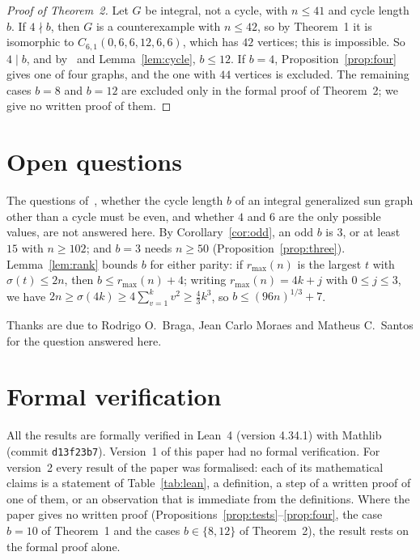 \documentclass[11pt]{article}
\theoremstyle{definition}
\theoremstyle{remark}
\begin{document}
\begin{proof}[Proof of Theorem~2]
Let $G$ be integral, not a cycle, with $n\le41$ and cycle length $b$. If
$4\nmid b$, then $G$ is a counterexample with $n\le42$, so by Theorem~1 it is
isomorphic to $C_{6,1}(0,6,6,12,6,6)$, which has $42$ vertices; this is
impossible. So $4\mid b$, and by~\cite[Theorem~2.1]{bms} and
Lemma~\ref{lem:cycle}, $b\le12$. If $b=4$, Proposition~\ref{prop:four} gives
one of four graphs, and the one with $44$ vertices is excluded. The remaining
cases $b=8$ and $b=12$ are excluded only in the formal proof of Theorem~2; we
give no written proof of them.
\end{proof}

\section{Open questions}\label{sec:open}
The questions of~\cite[Section~5]{bms}, whether the cycle length $b$ of an
integral generalized sun graph other than a cycle must be even, and whether $4$
and $6$ are the only possible values, are not answered here. By
Corollary~\ref{cor:odd}, an odd $b$ is $3$, or at least $15$ with $n\ge102$;
and $b=3$ needs $n\ge50$ (Proposition~\ref{prop:three}).
Lemma~\ref{lem:rank} bounds $b$ for either parity: if $r_{\max}(n)$ is the
largest $t$ with $\sigma(t)\le2n$, then $b\le r_{\max}(n)+4$; writing
$r_{\max}(n)=4k+j$ with $0\le j\le3$, we have
$2n\ge\sigma(4k)\ge4\sum_{v=1}^kv^2\ge\frac43k^3$, so $b\le(96n)^{1/3}+7$.

Thanks are due to Rodrigo O.\ Braga, Jean Carlo Moraes and Matheus C.\ Santos
for the question answered here.

\section{Formal verification}\label{sec:lean}
All the results are formally verified in Lean~4 (version 4.34.1) with
Mathlib~\cite{mathlib} (commit \texttt{d13f23b7}). Version~1 of this paper had
no formal verification. For version~2 every result of the paper was
formalised: each of its mathematical claims is a statement of
Table~\ref{tab:lean}, a definition, a step of a written proof of one of them,
or an observation that is immediate from the definitions. Where the paper
gives no written proof (Propositions~\ref{prop:tests}--\ref{prop:four}, the
case $b=10$ of Theorem~1 and the cases $b\in\{8,12\}$ of Theorem~2), the
result rests on the formal proof alone.
\end{document}
